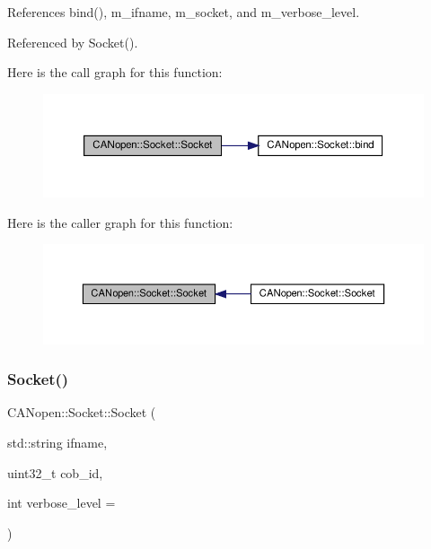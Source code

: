 References bind(), m\+\_\+ifname, m\+\_\+socket, and m\+\_\+verbose\+\_\+level.



Referenced by Socket().

Here is the call graph for this function\+:\nopagebreak
\begin{figure}[H]
\begin{center}
\leavevmode
\includegraphics[width=350pt]{class_c_a_nopen_1_1_socket_a66c37f6819a5ad8829326380812446e6_cgraph}
\end{center}
\end{figure}
Here is the caller graph for this function\+:
\nopagebreak
\begin{figure}[H]
\begin{center}
\leavevmode
\includegraphics[width=350pt]{class_c_a_nopen_1_1_socket_a66c37f6819a5ad8829326380812446e6_icgraph}
\end{center}
\end{figure}
\mbox{\label{class_c_a_nopen_1_1_socket_af234eea5568f8f436cb815ab70e75f2f}} 
\subsubsection{\texorpdfstring{Socket()}{Socket()}\hspace{0.1cm}{\footnotesize\ttfamily [2/2]}}
{\footnotesize\ttfamily C\+A\+Nopen\+::\+Socket\+::\+Socket (\begin{DoxyParamCaption}\item[{std\+::string}]{ifname,  }\item[{uint32\+\_\+t}]{cob\+\_\+id,  }\item[{int}]{verbose\+\_\+level = {} }\end{DoxyParamCaption})}



